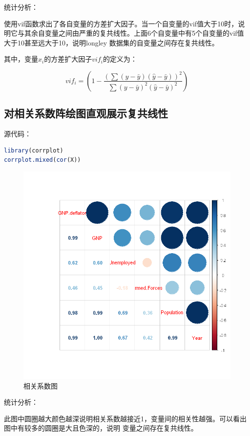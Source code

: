 \documentclass[a4paper,12pt]{article}
\begin{document}
统计分析：

使用vif函数求出了各自变量的方差扩大因子。当一个自变量的vif值大于10时，说明它与其余自变量之间由严重的复共线性。上面6个自变量中有5个自变量的vif值大于10甚至远大于10，说明longley
数据集的自变量之间存在复共线性。

其中，变量$x_i$的方差扩大因子$vif_i$的定义为：

$$vif_i=(1-\frac{(\sum (y-\bar{y})(\hat{y}-\bar{y}))^2}{\sum (y-\bar{y})^2(\hat{y}-\bar{y})^2})$$

\subsection{对相关系数阵绘图直观展示复共线性}

源代码：

\begin{lstlisting}[language=r,breaklines]
library(corrplot)
corrplot.mixed(cor(X))
\end{lstlisting}

\begin{figure}[htbp]
	\centering
	\includegraphics[scale=0.4]{output_8_1.png}
	\caption{相关系数图}
\end{figure}

统计分析：

此图中圆圈越大颜色越深说明相关系数越接近1，变量间的相关性越强。可以看出图中有较多的圆圈是大且色深的，说明
变量之间存在复共线性。
\end{document}
